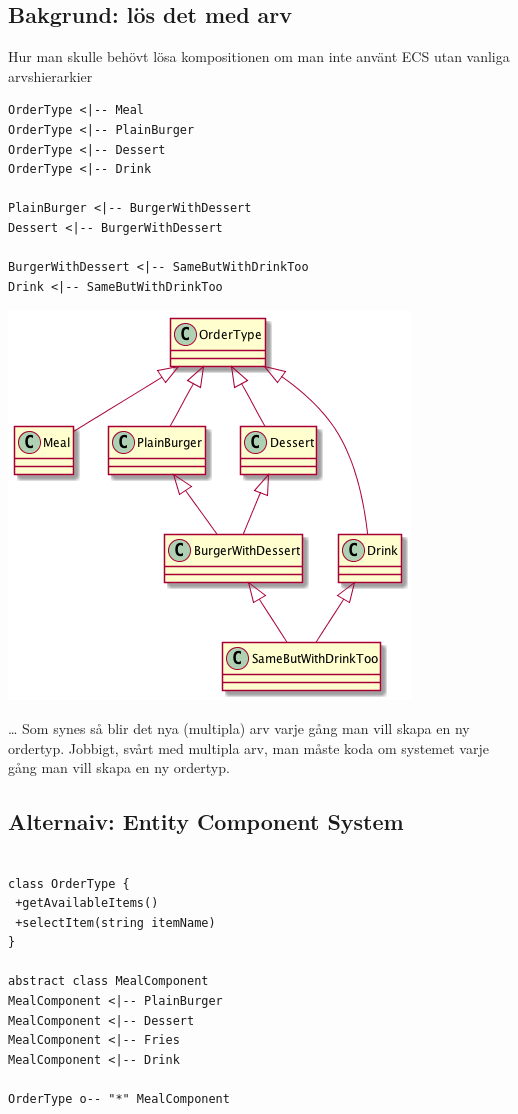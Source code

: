 \documentclass[11pt]{article}
\begin{document}
\subsection{Bakgrund: lös det med arv}
\label{sec:orgcca613c}
Hur man skulle behövt lösa kompositionen om man inte använt ECS utan vanliga arvshierarkier
\begin{verbatim}
OrderType <|-- Meal
OrderType <|-- PlainBurger
OrderType <|-- Dessert
OrderType <|-- Drink

PlainBurger <|-- BurgerWithDessert
Dessert <|-- BurgerWithDessert

BurgerWithDessert <|-- SameButWithDrinkToo
Drink <|-- SameButWithDrinkToo

\end{verbatim}

\begin{center}
\includegraphics[width=.9\linewidth]{202004-ecs-inheritance.png}
\end{center}

\ldots{} Som synes så blir det nya (multipla) arv varje gång man vill skapa en ny ordertyp. Jobbigt, svårt med multipla arv, man måste koda om systemet varje gång man vill skapa en ny ordertyp.

\subsection{Alternaiv: Entity Component System}
\label{sec:org020b517}
\begin{verbatim}

class OrderType {
 +getAvailableItems()
 +selectItem(string itemName)
}

abstract class MealComponent
MealComponent <|-- PlainBurger
MealComponent <|-- Dessert
MealComponent <|-- Fries
MealComponent <|-- Drink

OrderType o-- "*" MealComponent

\end{verbatim}
\end{document}
